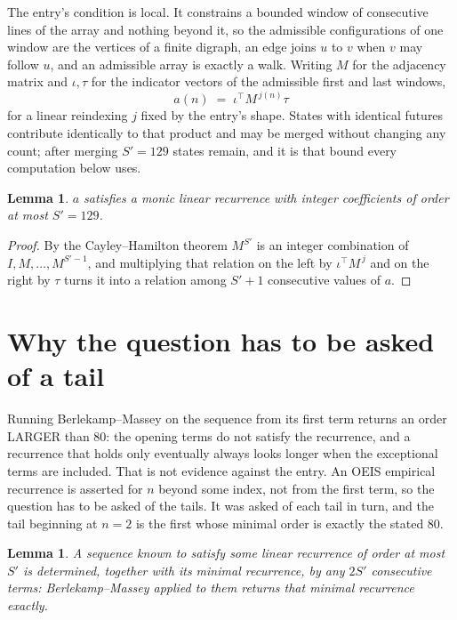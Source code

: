 \documentclass[11pt,a4paper]{article}
\theoremstyle{plain}
\newtheorem{lemma}[theorem]{Lemma}
\theoremstyle{definition}
\begin{document}
The entry's condition is local. It constrains a bounded window of consecutive lines of the
array and nothing beyond it, so the admissible configurations of one window are the vertices of
a finite digraph, an edge joins $u$ to $v$ when $v$ may follow $u$, and an admissible array is
exactly a walk. Writing $M$ for the adjacency matrix and $\iota,\tau$ for the indicator vectors
of the admissible first and last windows,
\[
a(n)\;=\;\iota^{\!\top}M^{\,j(n)}\tau
\]
for a linear reindexing $j$ fixed by the entry's shape. States with identical futures
contribute identically to that product and may be merged without changing any count; after
merging $S'=129$ states remain, and it is that bound every computation below uses.

\begin{lemma}\label{lem:cf}
$a$ satisfies a monic linear recurrence with integer coefficients of order at most $S'=129$.
\end{lemma}

\begin{proof}
By the Cayley--Hamilton theorem $M^{S'}$ is an integer combination of $I,M,\dots,M^{S'-1}$,
and multiplying that relation on the left by $\iota^{\!\top}M^{\,j}$ and on the right by
$\tau$ turns it into a relation among $S'+1$ consecutive values of $a$.
\end{proof}

\section{Why the question has to be asked of a tail}

Running Berlekamp--Massey on the sequence from its first term returns an order LARGER than $80$: the opening terms do not satisfy the recurrence, and a recurrence that holds only eventually always looks longer when the exceptional terms are included. That is not evidence against the entry. An OEIS empirical recurrence is asserted for $n$ beyond some index, not from the first term, so the question has to be asked of the tails. It was asked of each tail in turn, and the tail beginning at $n=2$ is the first whose minimal order is exactly the stated $80$.

\begin{lemma}\label{lem:bm}
A sequence known to satisfy some linear recurrence of order at most $S'$ is determined,
together with its minimal recurrence, by any $2S'$ consecutive terms: Berlekamp--Massey applied
to them returns that minimal recurrence exactly.
\end{lemma}
\end{document}
